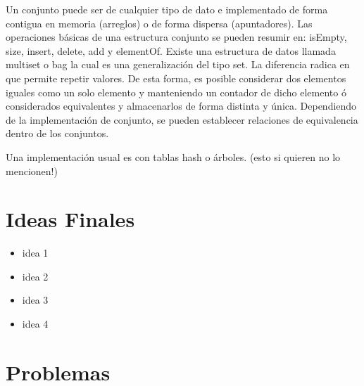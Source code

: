 Un conjunto puede ser de cualquier tipo de dato e implementado de forma contigua en memoria (arreglos) o de forma dispersa (apuntadores). Las operaciones básicas de una estructura conjunto se pueden resumir en: isEmpty, size, insert, delete, add y elementOf.
Existe una estructura de datos llamada multiset o bag la cual es una generalización del tipo set. La diferencia radica en que permite repetir valores. De esta forma, es posible considerar dos elementos iguales como un solo elemento y manteniendo un contador de dicho elemento ó considerados equivalentes y almacenarlos de forma distinta y única. Dependiendo de la implementación de conjunto, se pueden establecer relaciones de equivalencia dentro de los conjuntos. 

Una implementación usual es con tablas hash o árboles. (esto si quieren no lo mencionen!)

\section{Ideas Finales}

\begin{itemize}
\item idea 1
\item idea 2
\item idea 3
\item idea 4
\end{itemize}

\section{Problemas}
